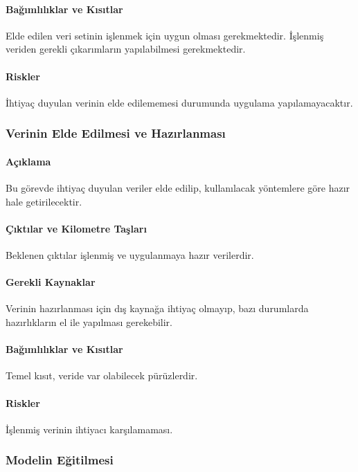 \documentclass[12pt,a4paper]{article}
\begin{document}
   \paragraph{Bağımlılıklar ve Kısıtlar}
   Elde edilen veri setinin işlenmek için uygun olması gerekmektedir. İşlenmiş veriden gerekli çıkarımların yapılabilmesi gerekmektedir.

   \paragraph{Riskler}
   İhtiyaç duyulan verinin elde edilememesi durumunda uygulama yapılamayacaktır.


   \subsubsection{Verinin Elde Edilmesi ve Hazırlanması}
   \paragraph{Açıklama}
   Bu görevde ihtiyaç duyulan veriler elde edilip, kullanılacak yöntemlere göre hazır hale getirilecektir.

   \paragraph{Çıktılar ve Kilometre Taşları}
   Beklenen çıktılar işlenmiş ve uygulanmaya hazır verilerdir.

   \paragraph{Gerekli Kaynaklar}
   Verinin hazırlanması için dış kaynağa ihtiyaç olmayıp, bazı durumlarda hazırlıkların el ile yapılması gerekebilir.

   \paragraph{Bağımlılıklar ve Kısıtlar}
   Temel kısıt, veride var olabilecek pürüzlerdir.

   \paragraph{Riskler}
   İşlenmiş verinin ihtiyacı karşılamaması.


   \subsubsection{Modelin Eğitilmesi}
\end{document}
